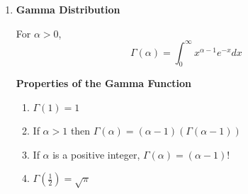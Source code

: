 \documentclass[12pt, twoside]{article}
\begin{document}
\begin{enumerate}
{	\begin{proof}
		\begin{align*}
			 \sqrt{2\pi} = I &= \int^{\infty}_{-\infty} e^{-(1/2)x^2} dx  && \text{(so we need to prove that $I = \sqrt{2\pi}$)}\\
			I &= \int^{\infty}_{-\infty} e^{-(1/2)y^2} dy  && \text{(Variable change)}\\
			I^2 &= \int^{\infty}_{-\infty} \int^{\infty}_{-\infty} e^{-(1/2)y^2} e^{-(1/2)x^2} dy dx && \text{("just assume this is true" - Mahinda)}\\
			&= \int^{\infty}_{-\infty} \int^{\infty}_{-\infty} e^{-(1/2)(y^2 + x^2)} dx dy\\
			&= \int^{2\pi}_{0} \int^{\infty}_{0} e^{-(1/2)(r^2 cos^2 \theta + r^2 sin^2 \theta)} r dr \int^{2\pi}_{0} && \text{(change to polar coordinates)}\\
			&=\int^{2\pi}_{0} [-e^{-(1/2)r^2}]^{\infty}_{0} d\theta\\
			&=\int^{2\pi}_{0} 1 d\theta\\
			I^2 &= 2\pi\\
			I &= \sqrt{2\pi}
		\end{align*}
	\end{proof}

	\textbf{Considering} $N(\mu, \sigma^2), f_X (x) = \frac{1}{\sigma \sqrt{2\pi}} e^{-(1/2)(\frac{x - \mu}{\sigma})^2}$
	
		$$\int^{\infty}_\infty \frac{1}{\sigma \sqrt{2\pi}} e^{-(1/2)(\frac{x - \mu}{\sigma})^2} dx$$
		
		\begin{tcolorbox}
			sub $z = \frac{x - \mu}{\sigma}$ we also get:
			$$dz = \frac{1}{\sigma} dx$$
		\end{tcolorbox}
		
		so now we have 
		$$\int^{\infty}_\infty \frac{1}{\sigma \sqrt{2\pi}} e^{-(1/2)z^2} \sigma dz = \int^{\infty}_\infty \frac{1}{\sqrt{2\pi}} e^{-(1/2)z^2} dz$$
		And this is the standard normal distribution

	}
	\item{
	\textbf{Gamma Distribution}
	
	\begin{tcolorbox}[title=Definition: Gamma Function]
		For $\alpha > 0$, $$\Gamma (\alpha) = \int^\infty_0 x^{\alpha - 1} e^{-x} dx$$
	\end{tcolorbox}

	\textbf{Properties of the Gamma Function}
	\begin{enumerate}
		\item{$\Gamma (1) = 1$}
		\item{If $\alpha > 1$ then $\Gamma (\alpha) = (\alpha - 1)(\Gamma (\alpha - 1))$}
		\item{If $\alpha$ is a positive integer, $\Gamma (\alpha) = (\alpha - 1)!$}
		\item{$\Gamma (\frac{1}{2}) = \sqrt{\pi}$}
	\end{enumerate}

}
\end{enumerate}
\end{document}
